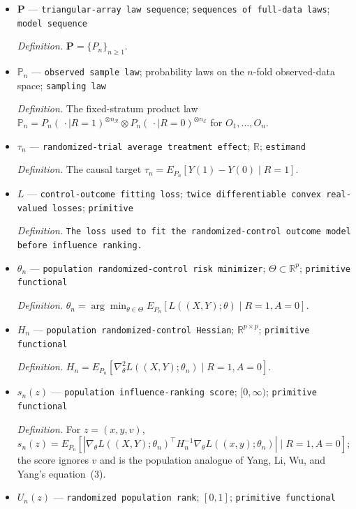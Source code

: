 \documentclass{article}
\begin{document}
\begin{itemize}
  \item \(\mathbf P\) --- \texttt{triangular-\allowbreak{}array law sequence}; \texttt{sequences of full-\allowbreak{}data laws}; \texttt{model sequence}
  \par\smallskip\noindent\emph{Definition.} \(\mathbf P=\{P_n\}_{n\ge1}\).
  \item \(\mathbb P_n\) --- \texttt{observed sample law}; probability laws on the \(n\)-fold observed-data space; \texttt{sampling law}
  \par\smallskip\noindent\emph{Definition.} The fixed-stratum product law \(\mathbb P_n=P_n(\,\cdot\mid R=1)^{\otimes n_{\mathcal R}}\otimes P_n(\,\cdot\mid R=0)^{\otimes n_{\mathcal E}}\) for \(O_1,\ldots,O_n\).
  \item \(\tau_n\) --- \texttt{randomized-\allowbreak{}trial average treatment effect}; \(\mathbb R\); \texttt{estimand}
  \par\smallskip\noindent\emph{Definition.} The causal target \(\tau_n=E_{P_n}[Y(1)-Y(0)\mid R=1]\).
  \item \(L\) --- \texttt{control-\allowbreak{}outcome fitting loss}; \texttt{twice differentiable convex real-\allowbreak{}valued losses}; \texttt{primitive}
  \par\smallskip\noindent\emph{Definition.} \texttt{The loss used to fit the randomized-\allowbreak{}control outcome model before influence ranking.}
  \item \(\theta_n\) --- \texttt{population randomized-\allowbreak{}control risk minimizer}; \(\Theta\subset\mathbb R^p\); \texttt{primitive functional}
  \par\smallskip\noindent\emph{Definition.} \(\theta_n=\arg\min_{\theta\in\Theta}E_{P_n}[L((X,Y);\theta)\mid R=1,A=0]\).
  \item \(H_n\) --- \texttt{population randomized-\allowbreak{}control Hessian}; \(\mathbb R^{p\times p}\); \texttt{primitive functional}
  \par\smallskip\noindent\emph{Definition.} \(H_n=E_{P_n}[\nabla_\theta^2L((X,Y);\theta_n)\mid R=1,A=0]\).
  \item \(s_n(z)\) --- \texttt{population influence-\allowbreak{}ranking score}; \([0,\infty)\); \texttt{primitive functional}
  \par\smallskip\noindent\emph{Definition.} For \(z=(x,y,v)\), \(s_n(z)=E_{P_n}[|\nabla_\theta L((X,Y);\theta_n)^\top H_n^{-1}\nabla_\theta L((x,y);\theta_n)|\mid R=1,A=0]\); the score ignores \(v\) and is the population analogue of Yang, Li, Wu, and Yang's equation~(3).
  \item \(U_n(z)\) --- \texttt{randomized population rank}; \([0,1]\); \texttt{primitive functional}

\end{itemize}
\end{document}
